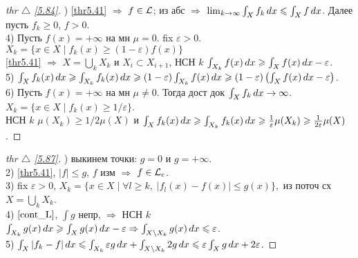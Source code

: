 
\begin{minipage}{0.9\textwidth}
\begin{proof}[
{thr} $\triangle$
\eqref{5.84}]

\phantom{42}

) \eqref{thr5.41} $\Rightarrow$ $f \in \mathcal{L}$; из абс $\Rightarrow$ $\lim_{k \to \infty} \int_X f_k \, d x \leqslant \int_X f \, d x$. Далее пусть $f_k \geq 0$, $f > 0$. \\
4) Пусть $f(x)=+\infty$ на мн $\mu=0$. fix $\varepsilon > 0$. 
$X_k = \{x \in X \mid f_k(x) \geq (1- \varepsilon) f(x)\}$ \\
\eqref{thr5.41} $\Rightarrow$  $X = \bigcup_k X_k$ и $X_i \subset X_{i+1}$,
НСН $k$ $\int_{X_k} f(x) \, d x \geqslant \int_X f(x) \, d x - \varepsilon$. \\
5) $\int_X f_k (x) \, d x \geqslant \int_{X_k} f_k (x) \, d x \geqslant (1- \varepsilon) \int_{X_k} f(x) \, d x \geqslant (1 - \varepsilon) \left(\int_X f(x) \, d x - \varepsilon\right) $. \\
6) Пусть $f(x)=+\infty$ на мн $\mu \neq 0$. Тогда дост док $\int_X f_k \, d x \to \infty$. $X_k = \{x \in X \mid f_k (x) \geq 1/ \varepsilon\}$. 
\\ НСН $k$ $\mu(X_k) \geq 1/2 \mu(X)$ и 
$\int_X f_k (x) \, d x \geqslant \int_{X_k} f_k (x) \, d x \geqslant \frac{1}{\varepsilon} \mu(X_k) \geqslant \frac{1}{2 \varepsilon} \mu(X)$.
\end{proof}
\end{minipage}

\phantom{42}

\begin{minipage}[]{0.9\textwidth}
\begin{proof}[
{thr} $\triangle$
\eqref{5.87}]

\phantom{42}

) выкинем точки: $g = 0$ и $g = + \infty$. \\
2) \eqref{thr5.41}, $|f| \leq g$, $f$ изм $\Rightarrow$ $f \in \mathcal{L}_c$. \\
3) fix $\varepsilon > 0$, $X_k = \{ x \in X \mid \forall l \geq k, \; |f_l(x) - f(x)| \leq  g(x)\},$ из поточ сх $X = \bigcup_k X_k$. \\
4) $\eqref{cont_L}$, $\int g$ непр, $\Rightarrow$ НСН $k$
$\int_{X_k} g(x) \, d x \geqslant \int_X g(x) \, d x - \varepsilon \Rightarrow 
\int_{X \setminus X_k} g(x) \, d x \leqslant \varepsilon$. \\
5) $\int_X |f_k - f| \, d x \leqslant \int_{X_k} \varepsilon g \, d x + \int_{X \setminus X_k} 2 g \, d x \leqslant \varepsilon \int_X g \, d x + 2 \varepsilon$.


\end{proof}
\end{minipage}


